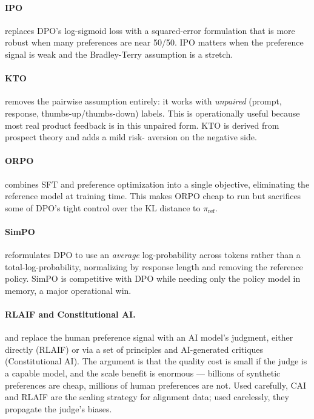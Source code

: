\paragraph{IPO} \citep{azar2023general} replaces DPO's log-sigmoid
loss with a squared-error formulation that is more robust when many
preferences are near 50/50. IPO matters when the preference signal
is weak and the Bradley-Terry assumption is a stretch.

\paragraph{KTO} \citep{ethayarajh2024kto} removes the pairwise
assumption entirely: it works with \emph{unpaired} (prompt,
response, thumbs-up/thumbs-down) labels. This is operationally
useful because most real product feedback is in this unpaired
form. KTO is derived from prospect theory and adds a mild risk-
aversion on the negative side.

\paragraph{ORPO} \citep{hong2024orpo} combines SFT and preference
optimization into a single objective, eliminating the reference
model at training time. This makes ORPO cheap to run but sacrifices
some of DPO's tight control over the KL distance to $\pi_\text{ref}$.

\paragraph{SimPO} \citep{meng2024simpo} reformulates DPO to use an
\emph{average} log-probability across tokens rather than a
total-log-probability, normalizing by response length and removing
the reference policy. SimPO is competitive with DPO while needing
only the policy model in memory, a major operational win.

\paragraph{RLAIF and Constitutional AI.} \citet{bai2022constitutional}
and \citet{lee2023rlaif} replace the human preference signal with
an AI model's judgment, either directly (RLAIF) or via a set of
principles and AI-generated critiques (Constitutional AI). The
argument is that the quality cost is small if the judge is a
capable model, and the scale benefit is enormous --- billions of
synthetic preferences are cheap, millions of human preferences are
not. Used carefully, CAI and RLAIF are the scaling strategy for
alignment data; used carelessly, they propagate the judge's biases.

